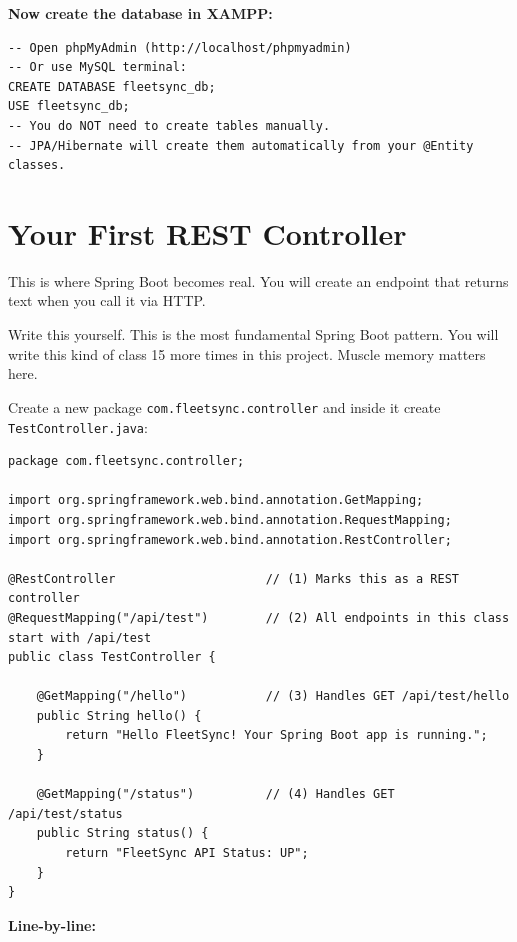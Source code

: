 \documentclass[12pt,a4paper]{report}
\newcommand{\file}[1]{\texttt{\textcolor{successgreen}{#1}}}
\begin{document}
\textbf{Now create the database in XAMPP:}

\begin{lstlisting}[style=sqlstyle,caption=Create the database in MySQL]
-- Open phpMyAdmin (http://localhost/phpmyadmin)
-- Or use MySQL terminal:
CREATE DATABASE fleetsync_db;
USE fleetsync_db;
-- You do NOT need to create tables manually.
-- JPA/Hibernate will create them automatically from your @Entity classes.
\end{lstlisting}

\section{Your First REST Controller}

This is where Spring Boot becomes real. You will create an endpoint that returns text when you call it via HTTP.

\begin{tcolorbox}[handbox]
Write this yourself. This is the most fundamental Spring Boot pattern. You will write this kind of class 15 more times in this project. Muscle memory matters here.
\end{tcolorbox}

Create a new package \file{com.fleetsync.controller} and inside it create \file{TestController.java}:

\begin{lstlisting}[caption=TestController.java -- Your First REST Endpoint]
package com.fleetsync.controller;

import org.springframework.web.bind.annotation.GetMapping;
import org.springframework.web.bind.annotation.RequestMapping;
import org.springframework.web.bind.annotation.RestController;

@RestController                     // (1) Marks this as a REST controller
@RequestMapping("/api/test")        // (2) All endpoints in this class start with /api/test
public class TestController {

    @GetMapping("/hello")           // (3) Handles GET /api/test/hello
    public String hello() {
        return "Hello FleetSync! Your Spring Boot app is running.";
    }

    @GetMapping("/status")          // (4) Handles GET /api/test/status
    public String status() {
        return "FleetSync API Status: UP";
    }
}
\end{lstlisting}

\textbf{Line-by-line:}
\end{document}
